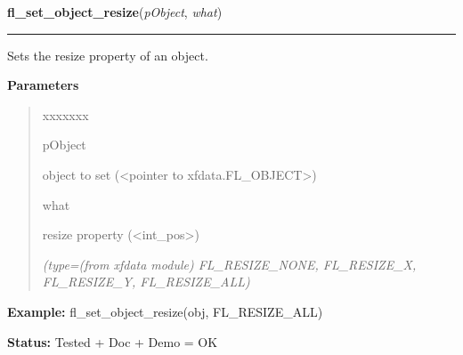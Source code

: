 \hspace{.8\funcindent}\begin{boxedminipage}{\funcwidth}

    \raggedright \textbf{fl\_set\_object\_resize}(\textit{pObject}, \textit{what})

    \vspace{-1.5ex}

    \rule{\textwidth}{0.5\fboxrule}
\setlength{\parskip}{2ex}
    Sets the resize property of an object.

\setlength{\parskip}{1ex}
      \textbf{Parameters}
      \vspace{-1ex}

      \begin{quote}
        \begin{Ventry}{xxxxxxx}

          \item[pObject]

          object to set ({\textless}pointer to 
          xfdata.FL\_OBJECT{\textgreater})

          \item[what]

          resize property ({\textless}int\_pos{\textgreater})

            {\it (type=(from xfdata module) FL\_RESIZE\_NONE, FL\_RESIZE\_X, FL\_RESIZE\_Y, 
FL\_RESIZE\_ALL)}

        \end{Ventry}

      \end{quote}

\textbf{Example:} fl\_set\_object\_resize(obj, FL\_RESIZE\_ALL)



\textbf{Status:} Tested + Doc + Demo = OK



    \end{boxedminipage}

    \label{xformslib:library:fl_get_object_resize}

    \vspace{0.5ex}

